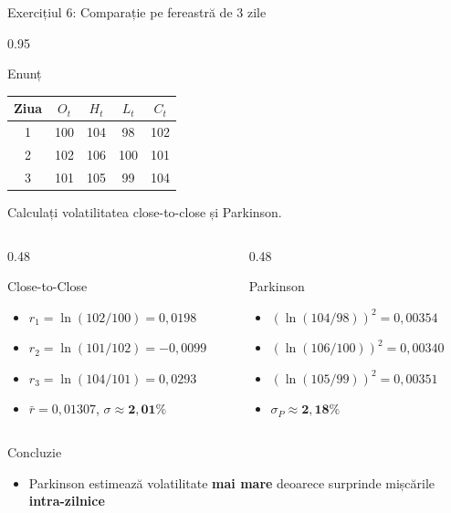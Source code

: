 \documentclass[9pt, aspectratio=169, t]{beamer}
\begin{document}
\begin{frame}[shrink=20]{Exercițiul 6: Comparație pe fereastră de 3 zile}
    \begin{cminipage}{0.95\textwidth}
    \begin{block}{Enunț}
    \begin{center}
    {\small\renewcommand{\arraystretch}{1.3}
    \begin{tabular}{c c c c c}
    \toprule
    Ziua & $O_t$ & $H_t$ & $L_t$ & $C_t$ \\
    \midrule
    1 & 100 & 104 & 98 & 102 \\
    2 & 102 & 106 & 100 & 101 \\
    3 & 101 & 105 & 99 & 104 \\
    \bottomrule
    \end{tabular}}
    \end{center}
    Calculați volatilitatea close-to-close și Parkinson.
    \end{block}
    \vspace{0.1cm}
    \begin{columns}[T]
    \begin{column}{0.48\textwidth}
    \begin{exampleblock}{Close-to-Close}
    \begin{itemize}\setlength{\itemsep}{0pt}
        \item $r_1 = \ln(102/100) = 0{,}0198$
        \item $r_2 = \ln(101/102) = -0{,}0099$
        \item $r_3 = \ln(104/101) = 0{,}0293$
        \item $\bar{r} = 0{,}01307$, \; $\sigma \approx \mathbf{2{,}01\%}$
    \end{itemize}
    \end{exampleblock}
    \end{column}
    \begin{column}{0.48\textwidth}
    \begin{exampleblock}{Parkinson}
    \begin{itemize}\setlength{\itemsep}{0pt}
        \item $(\ln(104/98))^2 = 0{,}00354$
        \item $(\ln(106/100))^2 = 0{,}00340$
        \item $(\ln(105/99))^2 = 0{,}00351$
        \item $\sigma_P \approx \mathbf{2{,}18\%}$
    \end{itemize}
    \end{exampleblock}
    \end{column}
    \end{columns}
    \vspace{0.1cm}
    \begin{alertblock}{Concluzie}
    \begin{itemize}\setlength{\itemsep}{0pt}
        \item Parkinson estimează volatilitate \textbf{mai mare} deoarece surprinde mișcările \textbf{intra-zilnice}
    \end{itemize}
    \end{alertblock}
    \end{cminipage}
\end{frame}
\end{document}

